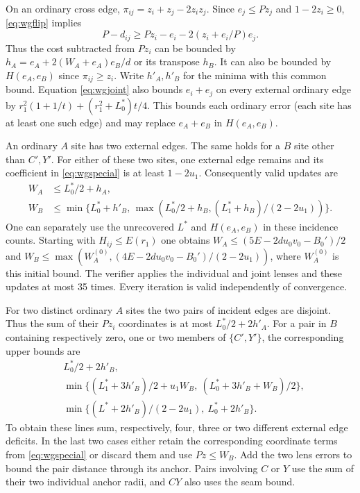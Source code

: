 \documentclass[11pt,a4paper]{article}
\theoremstyle{definition}
\begin{document}
On an ordinary cross edge, $\pi_{ij}=z_i+z_j-2z_iz_j$.
Since $e_j\le Pz_j$ and $1-2z_i\ge0$, \eqref{eq:wgflip} implies
\begin{equation}
 P-d_{ij}\ge Pz_i-e_i-2(z_i+e_i/P)e_j.\label{eq:wgoneside}
\end{equation}
Thus the cost subtracted from $Pz_i$ can be bounded by
$h_A=e_A+2(W_A+e_A)e_B/d$ or its transpose $h_B$.
It can also be bounded by $H(e_A,e_B)$ since $\pi_{ij}\ge z_i$.
Write $h'_A,h'_B$ for the minima with this common bound.
Equation \eqref{eq:wgjoint} also bounds $e_i+e_j$ on every external
ordinary edge by $r_1^2(1+1/t)+(r_1^2+L_0^*)t/4$. This bounds
each ordinary error (each site has at least one such edge) and may
replace $e_A+e_B$ in $H(e_A,e_B)$.

An ordinary $A$ site has two external edges. The same holds for a $B$
site other than $C',Y'$. For either of these two sites, one external
edge remains and its coefficient in \eqref{eq:wgspecial} is at least
$1-2u_1$. Consequently valid updates are
\begin{align*}
 W_A&\le L_0^*/2+h_A,\\
 W_B&\le \min\{L_0^*+h'_B,\,
    \max(L_0^*/2+h_B,(L_1^*+h_B)/(2-2u_1))\}.
\end{align*}
One can separately use the unrecovered $L^*$ and $H(e_A,e_B)$
in these incidence counts. Starting with $H_{ij}\le E(r_1)$
one obtains $W_A\le(5E-2du_0v_0-B_0')/2$ and
$W_B\le\max(W_A^{(0)},(4E-2du_0v_0-B_0')/(2-2u_1))$,
where $W_A^{(0)}$ is this initial bound. The verifier applies the
individual and joint lenses and these updates at most 35 times.
Every iteration is valid independently of convergence.

For two distinct ordinary $A$ sites the two pairs of incident edges
are disjoint. Thus the sum of their $Pz_i$ coordinates is at most
$L_0^*/2+2h'_A$. For a pair in $B$ containing respectively zero,
one or two members of $\{C',Y'\}$, the corresponding upper bounds are
\begin{align*}
 &L_0^*/2+2h'_B,\\
 &\min\{(L_1^*+3h'_B)/2+u_1W_B,\ (L_0^*+3h'_B+W_B)/2\},\\
 &\min\{(L^*+2h'_B)/(2-2u_1),\ L_0^*+2h'_B\}.
\end{align*}
To obtain these lines sum, respectively, four, three or two
different external edge deficits. In the last two cases either
retain the corresponding coordinate terms from \eqref{eq:wgspecial}
or discard them and use $Pz\le W_B$. Add the two lens errors to
bound the pair distance through its anchor. Pairs involving $C$ or
$Y$ use the sum of their two individual anchor radii, and $CY$
also uses the seam bound.
\end{document}
